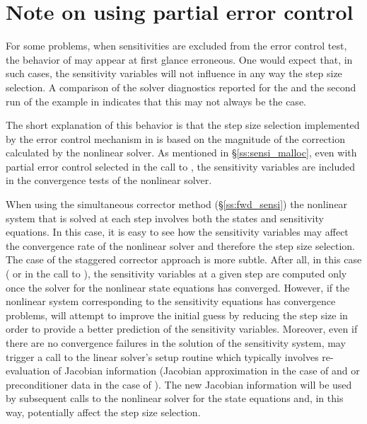 \section{Note on using partial error control}\label{ss:partial}
For some problems, when sensitivities are excluded from the error control test, 
the behavior of {\cvodes} may appear at first glance erroneous. One would
expect that, in such cases, the sensitivity variables will not influence in
any way the step size selection. A comparison of the solver diagnostics 
reported for the  and the second run of the  example 
in \cite{cvodes1.1_ex} indicates that this may not always be the case.

The short explanation of this behavior is that the step size selection
implemented by the error control mechanism in {\cvodes} is based on the 
magnitude of the correction calculated by the nonlinear solver. As mentioned
in \S\ref{ss:sensi_malloc}, even with partial error control selected
in the call to , the sensitivity variables are included
in the convergence tests of the nonlinear solver.

When using the simultaneous corrector method (\S\ref{ss:fwd_sensi}) 
the nonlinear system that is solved at each step involves both the states
and sensitivity equations. In this case, it is easy to see how the sensitivity 
variables may affect the convergence rate of the nonlinear solver and therefore
the step size selection. 
The case of the staggered corrector approach is more subtle. 
After all, in this case ( or  in the call 
to ), the sensitivity variables at a given step are 
computed only once the solver for the nonlinear state equations has converged.
However, if the nonlinear system corresponding to the sensitivity equations
has convergence problems, {\cvodes} will attempt to improve the initial guess
by reducing the step size in order to provide a better prediction of the
sensitivity variables. Moreover, even if there are no convergence failures in
the solution of the sensitivity system, {\cvodes} may trigger a call to the
linear solver's setup routine which typically involves re-evaluation of Jacobian
information (Jacobian approximation in the case of {\cvdense} and {\cvband} or
preconditioner data in the case of {\cvspgmr}). The new Jacobian information
will be used by subsequent calls to the nonlinear solver for the state equations
and, in this way, potentially affect the step size selection.

